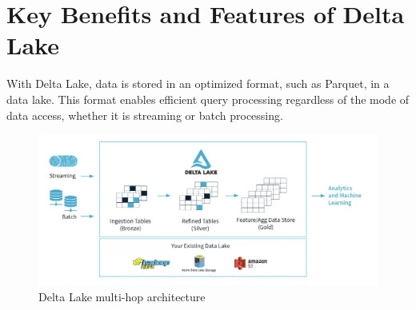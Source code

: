 \cite{deltalake}

\section{Key Benefits and Features of Delta Lake}
\begin{flushleft}
With Delta Lake, data is stored in an optimized format, such as Parquet, in a data lake. This format enables efficient query processing regardless of the mode of data access, whether it is streaming or batch processing.
\end{flushleft}

\cite{databricksdelta}

\begin{figure}[H]
\centering
\includegraphics[width=\linewidth]{images/delta_lake_architecture.png}
\caption{Delta Lake multi-hop architecture}\label{fig:delta-lake-architecture}
\end{figure}

